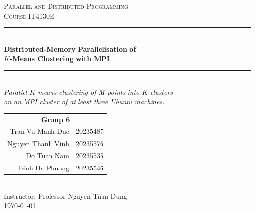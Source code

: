 \documentclass[11pt,a4paper]{article}
\newcommand{\groupid}{6}
\newcommand{\coursecode}{IT4130E}
\newcommand{\coursename}{Parallel and Distributed Programming}
\newcommand{\instructorname}{Professor Nguyen Tuan Dung}
\begin{document}
\begin{titlepage}
\centering
\vspace*{1.5cm}

{\large\scshape \coursename}\\[2pt]
{\large\scshape Course \coursecode}\\[1.2cm]

\rule{\linewidth}{0.4pt}\\[0.6cm]
{\LARGE\bfseries\color{accent} Distributed-Memory Parallelisation of\\[4pt]
$K$-Means Clustering with MPI\\[0.5cm]}
\rule{\linewidth}{0.4pt}\\[0.8cm]

{\large\itshape Parallel $K$-means clustering of $M$ points into $K$ clusters\\
on an MPI cluster of at least three Ubuntu machines.}\\[1.6cm]

\begin{tabular}{rl}
\multicolumn{2}{c}{\large\bfseries Group \groupid}\\[10pt]
Tran Vu Manh Duc & 20235487\\[3pt]
Nguyen Thanh Vinh & 20235576\\[3pt]
Do Tuan Nam & 20235535\\[3pt]
Trinh Ha Phuong & 20235546\\
\end{tabular}\\[1.6cm]

{\large Instructor: \instructorname}\\[0.8cm]
{\large \today}

\vfill
\end{titlepage}

\thispagestyle{fancy}
\tableofcontents
\clearpage
\end{document}
